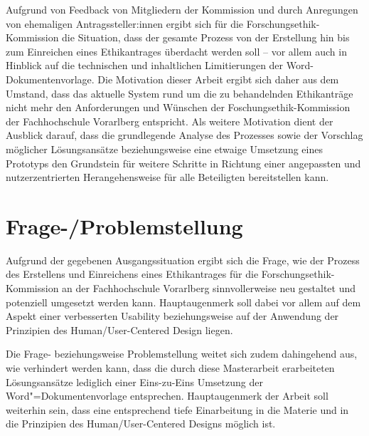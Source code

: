 \documentclass[a4paper,12pt,twoside]{scrreprt}
\begin{document}
\medskip

Aufgrund von Feedback von Mitgliedern der Kommission und durch Anregungen von ehemaligen Antragssteller:innen ergibt sich für die Forschungsethik-Kommission die Situation, dass der gesamte Prozess von der Erstellung hin bis zum Einreichen eines Ethikantrages überdacht werden soll -- vor allem auch in Hinblick auf die technischen und inhaltlichen Limitierungen der Word-Dokumentenvorlage. Die Motivation dieser Arbeit ergibt sich daher aus dem Umstand, dass das aktuelle System rund um die zu behandelnden Ethikanträge nicht mehr den Anforderungen und Wünschen der Foschungsethik-Kommission der Fachhochschule Vorarlberg entspricht. Als weitere Motivation dient der Ausblick darauf, dass die grundlegende Analyse des Prozesses sowie der Vorschlag möglicher Lösungsansätze beziehungsweise eine etwaige Umsetzung eines Prototyps den Grundstein für weitere Schritte in Richtung einer angepassten und nutzerzentrierten Herangehensweise für alle Beteiligten bereitstellen kann. 

\section{Frage-/Problemstellung}
\label{sec:frage-problemstellung}

Aufgrund der gegebenen Ausgangssituation ergibt sich die Frage, wie der Prozess des Erstellens und Einreichens eines Ethikantrages für die Forschungsethik-Kommission an der Fachhochschule Vorarlberg sinnvollerweise neu gestaltet und potenziell umgesetzt werden kann. Hauptaugenmerk soll dabei vor allem auf dem Aspekt einer verbesserten Usability beziehungsweise auf der Anwendung der Prinzipien des Human/User-Centered Design liegen.

Die Frage- beziehungsweise Problemstellung weitet sich zudem dahingehend aus, wie verhindert werden kann, dass die durch diese Masterarbeit erarbeiteten Lösungsansätze lediglich einer Eins-zu-Eins Umsetzung der Word"=Dokumentenvorlage entsprechen. Hauptaugenmerk der Arbeit soll weiterhin sein, dass eine entsprechend tiefe Einarbeitung in die Materie und in die Prinzipien des Human/User-Centered Designs möglich ist.

\medskip
\end{document}
